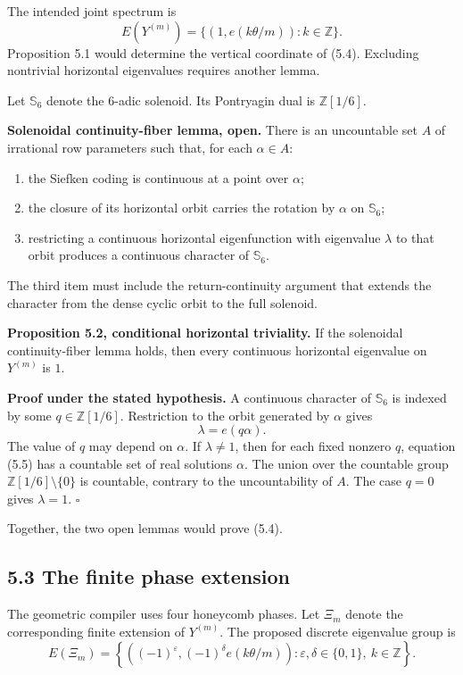 \documentclass[11pt]{article}
\begin{document}
The intended joint spectrum is
\[
  E(Y^{(m)})=
  \{(1,e(k\theta/m)):k\in\mathbb Z\}.
  \tag{5.4}
\]
Proposition 5.1 would determine the vertical coordinate of (5.4). Excluding
nontrivial horizontal eigenvalues requires another lemma.

Let \(\mathbb S_6\) denote the \(6\)-adic solenoid. Its Pontryagin dual is
\(\mathbb Z[1/6]\).

\textbf{Solenoidal continuity-fiber lemma, open.} There is an uncountable set
\(A\) of irrational row parameters such that, for each \(\alpha\in A\):

\begin{enumerate}
\item the Siefken coding is continuous at a point over \(\alpha\);
\item the closure of its horizontal orbit carries the rotation by \(\alpha\)
   on \(\mathbb S_6\);
\item restricting a continuous horizontal eigenfunction with eigenvalue
   \(\lambda\) to that orbit produces a continuous character of
   \(\mathbb S_6\).
\end{enumerate}

The third item must include the return-continuity argument that extends the
character from the dense cyclic orbit to the full solenoid.

\textbf{Proposition 5.2, conditional horizontal triviality.} If the solenoidal
continuity-fiber lemma holds, then every continuous horizontal eigenvalue on
\(Y^{(m)}\) is \(1\).

\textbf{Proof under the stated hypothesis.} A continuous character of
\(\mathbb S_6\) is indexed by some \(q\in\mathbb Z[1/6]\). Restriction to
the orbit generated by \(\alpha\) gives
\[
  \lambda=e(q\alpha).
  \tag{5.5}
\]
The value of \(q\) may depend on \(\alpha\). If \(\lambda\ne1\), then for
each fixed nonzero \(q\), equation (5.5) has a countable set of real
solutions \(\alpha\). The union over the countable group
\(\mathbb Z[1/6]\setminus\{0\}\) is countable, contrary to the uncountability
of \(A\). The case \(q=0\) gives \(\lambda=1\). \(\square\)

Together, the two open lemmas would prove (5.4).

\subsection*{5.3 The finite phase extension}

The geometric compiler uses four honeycomb phases. Let \(\Xi_m\) denote the
corresponding finite extension of \(Y^{(m)}\). The proposed discrete
eigenvalue group is
\[
  E(\Xi_m)=
  \left\{
    \left(
      (-1)^\varepsilon,
      (-1)^\delta e(k\theta/m)
    \right):
    \varepsilon,\delta\in\{0,1\},\
    k\in\mathbb Z
  \right\}.
  \tag{5.6}
\]
\end{document}
